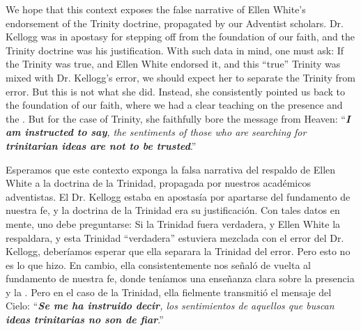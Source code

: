 We hope that this context exposes the false narrative of Ellen White's endorsement of the Trinity doctrine, propagated by our Adventist scholars. Dr. Kellogg was in apostasy for stepping off from the foundation of our faith, and the Trinity doctrine was his justification. With such data in mind, one must ask: If the Trinity was true, and Ellen White endorsed it, and this “true” Trinity was mixed with Dr. Kellogg's error, we should expect her to separate the Trinity from error. But this is not what she did. Instead, she consistently pointed us back to the foundation of our faith, where we had a clear teaching on the presence and the . But for the case of Trinity, she faithfully bore the message from Heaven: “\textit{\textbf{I am instructed to say}, the sentiments of those who are searching for \textbf{trinitarian ideas are not to be trusted}}.”


Esperamos que este contexto exponga la falsa narrativa del respaldo de Ellen White a la doctrina de la Trinidad, propagada por nuestros académicos adventistas. El Dr. Kellogg estaba en apostasía por apartarse del fundamento de nuestra fe, y la doctrina de la Trinidad era su justificación. Con tales datos en mente, uno debe preguntarse: Si la Trinidad fuera verdadera, y Ellen White la respaldara, y esta Trinidad “verdadera” estuviera mezclada con el error del Dr. Kellogg, deberíamos esperar que ella separara la Trinidad del error. Pero esto no es lo que hizo. En cambio, ella consistentemente nos señaló de vuelta al fundamento de nuestra fe, donde teníamos una enseñanza clara sobre la presencia y la . Pero en el caso de la Trinidad, ella fielmente transmitió el mensaje del Cielo: “\textit{\textbf{Se me ha instruido decir}, los sentimientos de aquellos que buscan \textbf{ideas trinitarias no son de fiar}}.”






